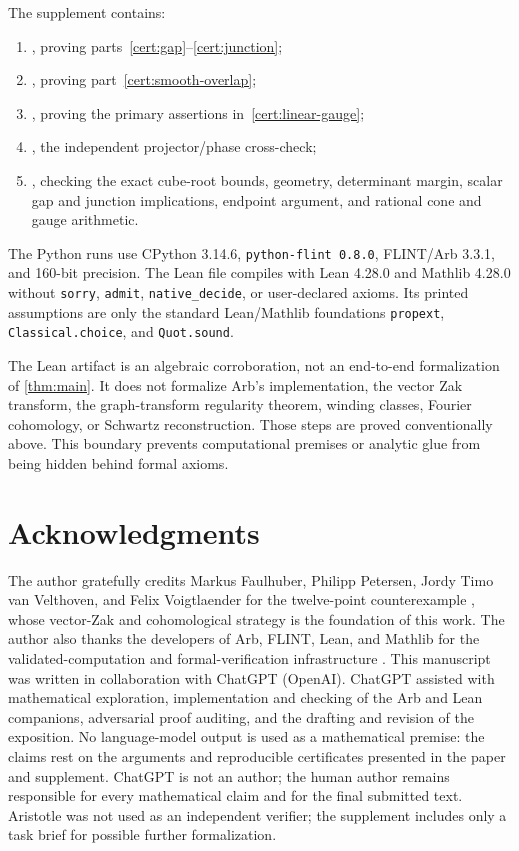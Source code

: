 \documentclass[11pt,reqno]{amsart}
\numberwithin{equation}{section}
\theoremstyle{definition}
\begin{document}
The supplement contains:
\begin{enumerate}[leftmargin=2.2em]
\item {}, proving
      parts~\ref{cert:gap}--\ref{cert:junction};
\item {}, proving
      part~\ref{cert:smooth-overlap};
\item {}, proving the primary
      assertions in~\ref{cert:linear-gauge};
\item {}, the independent
      projector/phase cross-check;
\item {}, checking the exact
      cube-root bounds, geometry, determinant margin, scalar gap and junction
      implications, endpoint argument, and rational cone and gauge arithmetic.
\end{enumerate}

The Python runs use CPython 3.14.6, \texttt{python-flint 0.8.0}, FLINT/Arb
3.3.1, and 160-bit precision.  The Lean file compiles with Lean 4.28.0 and
Mathlib 4.28.0
without \texttt{sorry}, \texttt{admit}, \texttt{native\_decide}, or
user-declared axioms.  Its printed assumptions are only the standard
Lean/Mathlib foundations \texttt{propext}, \texttt{Classical.choice}, and
\texttt{Quot.sound}.

The Lean artifact is an algebraic corroboration, not an end-to-end
formalization of \cref{thm:main}.  It does not formalize Arb's implementation,
the vector Zak transform, the graph-transform regularity theorem, winding
classes, Fourier cohomology, or Schwartz reconstruction.  Those steps are
proved conventionally above.  This boundary prevents computational premises
or analytic glue from being hidden behind formal axioms.

\section*{Acknowledgments}

The author gratefully credits Markus Faulhuber, Philipp Petersen,
Jordy Timo van Velthoven, and Felix Voigtlaender for the twelve-point
counterexample \cite{FPPV2026}, whose vector-Zak and cohomological strategy is
the foundation of this work.  The author also thanks the developers of Arb,
FLINT, Lean, and Mathlib for the validated-computation and
formal-verification infrastructure \cite{johansson2017arb,Lean4,Mathlib}.
This manuscript was written in collaboration with ChatGPT (OpenAI).
ChatGPT assisted with mathematical exploration, implementation and checking
of the Arb and Lean companions, adversarial proof auditing, and the drafting
and revision of the exposition.  No language-model output is used as a
mathematical premise: the claims rest on the arguments and reproducible
certificates presented in the paper and supplement.  ChatGPT is not an author;
the human author remains responsible for every mathematical claim and for the
final submitted text.
Aristotle was not used as an independent verifier; the supplement includes
only a task brief for possible further formalization.



\end{document}
